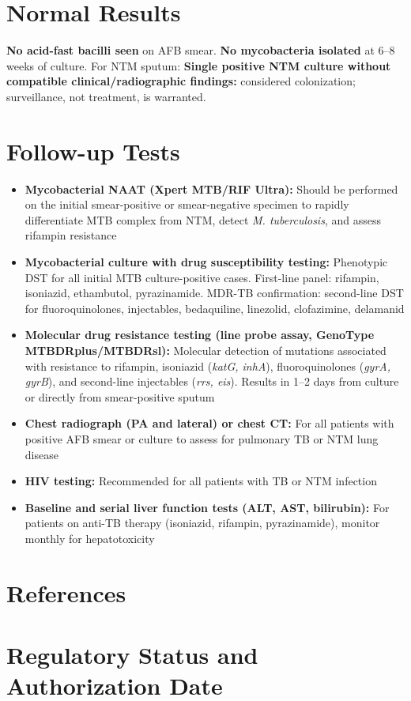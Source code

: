 \section*{Normal Results}
\textbf{No acid-fast bacilli seen} on AFB smear. \textbf{No mycobacteria isolated} at 6--8 weeks of culture. For NTM sputum: \textbf{Single positive NTM culture without compatible clinical/radiographic findings:} considered colonization; surveillance, not treatment, is warranted.

\section*{Follow-up Tests}
\begin{itemize}
  \item \textbf{Mycobacterial NAAT (Xpert MTB/RIF Ultra):} Should be performed on the initial smear-positive or smear-negative specimen to rapidly differentiate MTB complex from NTM, detect \textit{M. tuberculosis}, and assess rifampin resistance
  \item \textbf{Mycobacterial culture with drug susceptibility testing:} Phenotypic DST for all initial MTB culture-positive cases. First-line panel: rifampin, isoniazid, ethambutol, pyrazinamide. MDR-TB confirmation: second-line DST for fluoroquinolones, injectables, bedaquiline, linezolid, clofazimine, delamanid
  \item \textbf{Molecular drug resistance testing (line probe assay, GenoType MTBDRplus/MTBDRsl):} Molecular detection of mutations associated with resistance to rifampin, isoniazid (\textit{katG, inhA}), fluoroquinolones (\textit{gyrA, gyrB}), and second-line injectables (\textit{rrs, eis}). Results in 1--2 days from culture or directly from smear-positive sputum
  \item \textbf{Chest radiograph (PA and lateral) or chest CT:} For all patients with positive AFB smear or culture to assess for pulmonary TB or NTM lung disease
  \item \textbf{HIV testing:} Recommended for all patients with TB or NTM infection
  \item \textbf{Baseline and serial liver function tests (ALT, AST, bilirubin):} For patients on anti-TB therapy (isoniazid, rifampin, pyrazinamide), monitor monthly for hepatotoxicity
\end{itemize}

\section*{References}



\clearpage
\section*{Regulatory Status and Authorization Date}

\clearpage
